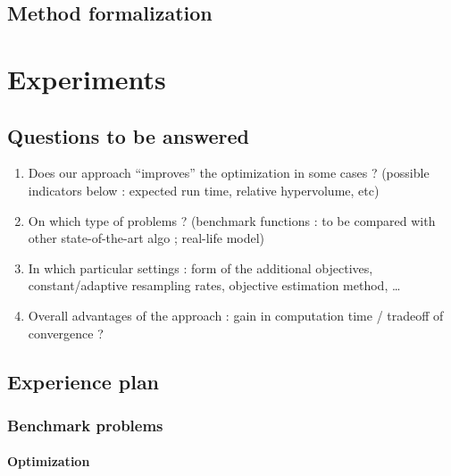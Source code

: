 \subsection{Method formalization}








\section{Experiments}


\subsection{Questions to be answered}

\begin{enumerate}
\item Does our approach ``improves'' the optimization in some cases ? (possible indicators below : expected run time, relative hypervolume, etc)
\item On which type of problems ? (benchmark functions : to be compared with other state-of-the-art algo ; real-life model)
\item In which particular settings : form of the additional objectives, constant/adaptive resampling rates, objective estimation method, \ldots
\item Overall advantages of the approach : gain in computation time / tradeoff of convergence ?
\end{enumerate}


\subsection{Experience plan}


\subsubsection{Benchmark problems}

\paragraph{Optimization}

